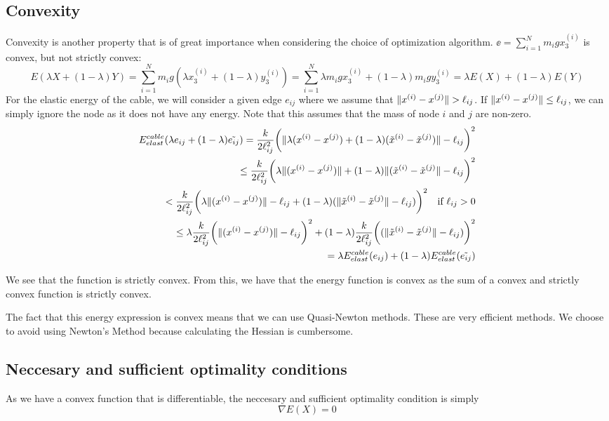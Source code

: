 \subsection{Convexity}

Convexity is another property that is of great importance when considering the choice of optimization algorithm.  $\ee =\sum_{i=1}^N m_i g x_3^{(i)}$ is convex, but not strictly convex:
\begin{equation*}
    E(\lambda X +(1-\lambda) Y) = \sum_{i=1}^N m_i g (\lambda x_3^{(i)} + (1-\lambda) y_3^{(i)})
    =\sum_{i=1}^N \lambda m_i g x_3^{(i)} + (1-\lambda) m_i g  y_3^{(i)} = \lambda E(X) + (1-\lambda) E(Y)
\end{equation*}
For the elastic energy of the cable, we will consider a given edge $e_{ij}$ where we assume that $\lVert x^{(i)} - x^{(j)}\rVert > \ell_{ij}$. If $\lVert x^{(i)} - x^{(j)}\rVert \leq \ell_{ij}$, we can simply ignore the node as it does not have any energy. Note that this assumes that the mass of node $i$ and $j$ are non-zero.
\begin{align*}
     E^{cable}_{elast}(\lambda e_{ij} + (1-\lambda) \tilde{e_{ij}}) = \frac{k}{2 \ell_{ij}^2} \bigg( \lVert \lambda(x^{(i)}-x^{(j)}) + ( 1-\lambda ) (\tilde{x}^{(i)}-\tilde{x}^{(j)} )\rVert -\ell_{ij}\bigg)^2\\ \leq \frac{k}{2 \ell_{ij}^2} \bigg( \lambda \lVert (x^{(i)}-x^{(j)}) \rVert +( 1-\lambda ) \lVert (\tilde{x}^{(i)}-\tilde{x}^{(j)} \rVert -\ell_{ij}\bigg)^2 \\ <
     \frac{k}{2 \ell_{ij}^2}\bigg( \lambda\lVert  (x^{(i)}-x^{(j)}) \rVert - \ell_{ij} +( 1-\lambda ) ( \lVert \tilde{x}^{(i)}-\tilde{x}^{(j)} \rVert -\ell_{ij} ) \bigg)^2 \quad \text{if $\ell_{ij} > 0$} \\
     \leq \lambda \frac{k}{2 \ell_{ij}^2}\bigg( \lVert  (x^{(i)}-x^{(j)}) \rVert - \ell_{ij} \bigg)^2 + ( 1-\lambda )\frac{k}{2 \ell_{ij}^2}\bigg( ( \lVert \tilde{x}^{(i)}-\tilde{x}^{(j)} \rVert -\ell_{ij} ) \bigg)^2 \\= \lambda E^{cable}_{elast}(e_{ij}) + (1-\lambda) E^{cable}_{elast}(\Tilde{e_{ij}})
\end{align*}

We see that the function is strictly convex. From this, we have that the energy function is convex as the sum of a convex and strictly convex function is strictly convex. 

The fact that this energy expression is convex means that we can use Quasi-Newton methods. These are very efficient methods. We choose to avoid using Newton's Method because calculating the Hessian is cumbersome.

\subsection{Neccesary and sufficient optimality conditions}
As we have a convex function that is differentiable, the neccesary and sufficient optimality condition is simply \begin{equation}
    \nabla E(X) = 0
\end{equation}